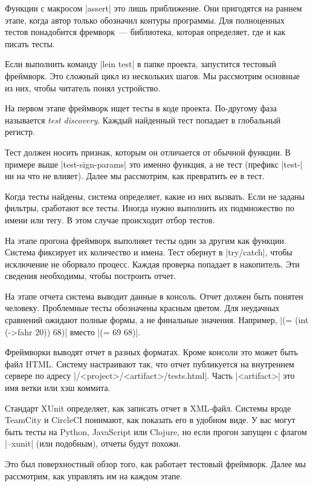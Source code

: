 Функции с макросом \spverb|assert| это лишь приближение. Они пригодятся на
раннем этапе, когда автор только обозначил контуры программы. Для полноценных
тестов понадобится фремворк~--- библиотека, которая определяет, где и как писать
тесты.

Если выполнить команду \spverb|lein test| в папке проекта, запустится тестовый
фреймворк. Это сложный цикл из нескольких шагов. Мы рассмотрим основные из них,
чтобы читатель понял устройство.

На первом этапе фреймворк ищет тесты в коде проекта. По-другому фаза называется
\emph{test discovery}. Каждый найденный тест попадает в глобальный регистр.

Тест должен носить признак, которым он отличается от обычной функции. В примере
выше \spverb|test-sign-params| это именно функция, а не тест (префикс
\spverb|test-| ни на что не влияет). Далее мы рассмотрим, как превратить ее в
тест.

Когда тесты найдены, система определяет, какие из них вызвать. Если не заданы
фильтры, сработают все тесты. Иногда нужно выполнить их подмножество по имени
или тегу. В этом случае происходит отбор тестов.

На этапе прогона фреймворк выполняет тесты один за другим как функции. Система
фиксирует их количество и имена. Тест обернут в \spverb|try/catch|, чтобы
исключение не оборвало процесс. Каждая проверка попадает в накопитель. Эти
сведения необходимы, чтобы построить отчет.

На этапе отчета система выводит данные в консоль. Отчет должен быть понятен
человеку. Проблемные тесты обозначены красным цветом. Для неудачных сравнений
ожидают полные формы, а не финальные значения. Например,
\spverb|(= (int (->fahr 20)) 68)| вместо \spverb|(= 69 68)|.

Фреймворки выводят отчет в разных форматах. Кроме консоли это может быть файл
HTML. Систему настраивают так, что отчет публикуется на внутреннем сервере по
адресу \spverb|/<project>/<artifact>/tests.html|. Часть \spverb|<artifact>| это
имя ветки или хэш коммита.

Стандарт XUnit определяет, как записать отчет в XML-файл. Системы вроде TeamCity
и CircleCI понимают, как показать его в удобном виде. У вас могут быть тесты на
Python, JavaScript или Clojure, но если прогон запущен с флагом \spverb|--xunit|
(или подобным), отчеты будут похожи.

Это был поверхностный обзор того, как работает тестовый фреймворк. Далее мы
рассмотрим, как управлять им на каждом этапе.

